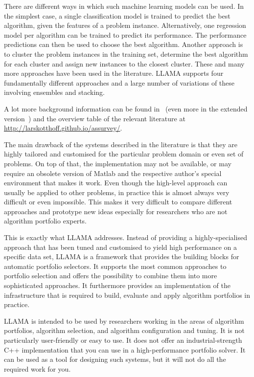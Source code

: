 \documentclass{article}\usepackage[]{graphicx}\usepackage[]{color}
\begin{document}
There are different ways in which such machine learning models can be used. In
the simplest case, a single classification model is trained to predict the best
algorithm, given the features of a problem instance. Alternatively, one
regression model per algorithm can be trained to predict its performance. The
performance predictions can then be used to choose the best algorithm. Another
approach is to cluster the problem instances in the training set, determine the
best algorithm for each cluster and assign new instances to the closest cluster.
These and many more approaches have been used in the literature. LLAMA supports
four fundamentally different approaches and a large number of variations of
these involving ensembles and stacking.

A lot more background information can be found
in~\cite{kotthoff_algorithm_2014} (even more in the extended
version~\cite{kotthoff_algorithm_2012}) and the overview table of the relevant
literature at\\
\url{http://larskotthoff.github.io/assurvey/}.

\medskip

The main drawback of the systems described in the literature is that they are
highly tailored and customised for the particular problem domain or even set of
problems. On top of that, the implementation may not be available, or may
require an obsolete version of Matlab and the respective author's special
environment that makes it work. Even though the high-level approach can usually
be applied to other problems, in practice this is almost always very difficult
or even impossible. This makes it very difficult to compare different approaches
and prototype new ideas especially for researchers who are not algorithm
portfolio experts.

This is exactly what LLAMA addresses. Instead of providing a highly-specialised
approach that has been tuned and customised to yield high performance on a
specific data set, LLAMA is a framework that provides the building blocks for
automatic portfolio selectors. It supports the most common approaches to
portfolio selection and offers the possibility to combine them into more
sophisticated approaches. It furthermore provides an implementation of the
infrastructure that is required to build, evaluate and apply algorithm
portfolios in practice.

LLAMA is intended to be used by researchers working in the areas of algorithm
portfolios, algorithm selection, and algorithm configuration and tuning. It is
not particularly user-friendly or easy to use. It does not offer an
industrial-strength C++ implementation that you can use in a high-performance
portfolio solver. It can be used as a tool for designing such systems, but it
will not do all the required work for you.
\end{document}
